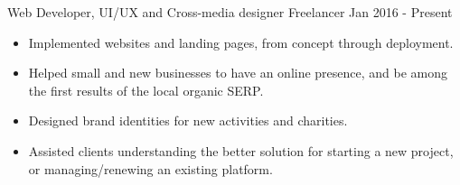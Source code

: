 \documentclass[11pt]{strongalecv}
\begin{document}
    





    \begin{MainPart}

    \Experience
        {\ColorTextMain}
		{Web Developer, UI/UX and Cross-media designer}
		{Freelancer}
        {\faCalendarO\space Jan 2016 - Present}
        {   
            \begin{itemize}[leftmargin=0.5cm, itemsep=0.1cm]
                \item [{\color{purple}\tiny\faSquare}] \small Implemented websites and landing pages, from concept through deployment.
                \item [{\color{purple}\tiny\faSquare}] \small Helped small and new businesses to have an online presence, and be among the first results of the local organic SERP.
                \item [{\color{purple}\tiny\faSquare}] \small Designed brand identities for new activities and charities.
                \item [{\color{purple}\tiny\faSquare}] \small Assisted clients understanding the better solution for starting a new project, or managing/renewing an existing platform.
            \end{itemize}
        }
        

\end{MainPart}
\end{document}
